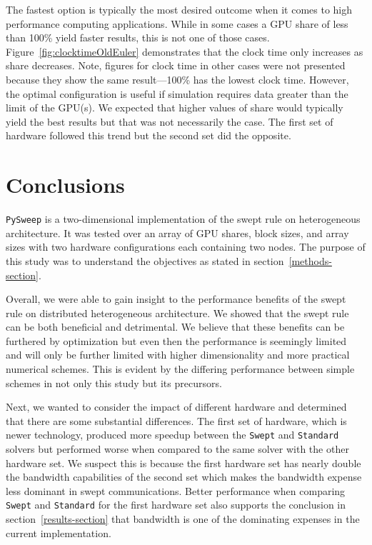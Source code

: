 \documentclass[preprints,article,accept,moreauthors,pdftex]{Definitions/mdpi}
\def\pysweep{\texttt{PySweep}}
\def\Swept{\texttt{Swept}}
\def\Standard{\texttt{Standard}}
\begin{document}
The fastest option is typically the most desired outcome when it comes to high performance computing applications. While in some cases a GPU share of less than 100\% yield faster results, this is not one of those cases. Figure~\ref{fig:clocktimeOldEuler} demonstrates that the clock time only increases as share decreases. Note, figures for clock time in other cases were not presented because they show the same result---100\% has the lowest clock time. However, the optimal configuration is useful if simulation requires data greater than the limit of the GPU(s). We expected that higher values of share would typically yield the best results but that was not necessarily the case. The first set of hardware followed this trend but the second set did the opposite. 

\section{Conclusions}

\label{conclusions-section}
\pysweep{} is a two-dimensional implementation of the swept rule on heterogeneous architecture. It was tested over an array of GPU shares, block sizes, and array sizes with two hardware configurations each containing two nodes. The purpose of this study was to understand the objectives as stated in section~\ref{methods-section}.

Overall, we were able to gain insight to the performance benefits of the swept rule on distributed heterogeneous architecture. We showed that the swept rule can be both beneficial and detrimental. We believe that these benefits can be furthered by optimization but even then the performance is seemingly limited and will only be further limited with higher dimensionality and more practical numerical schemes. This is evident by the differing performance between simple schemes in not only this study but its precursors.

Next, we wanted to consider the impact of different hardware and determined that there are some substantial differences. The first set of hardware, which is newer technology, produced more speedup between the \Swept{} and \Standard{} solvers but performed worse when compared to the same solver with the other hardware set. We suspect this is because the first hardware set has nearly double the bandwidth capabilities of the second set which makes the bandwidth expense less dominant in swept communications. Better performance when comparing \Swept{} and \Standard{} for the first hardware set also supports the conclusion in section~\ref{results-section} that bandwidth is one of the dominating expenses in the current implementation.
\end{document}
